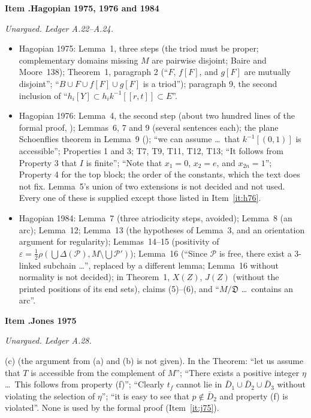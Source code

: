 \documentclass[11pt]{article}
\newcounter{defect}
\newenvironment{defect}[4]{%
  \par\addvspace{10pt}\refstepcounter{defect}%
  \noindent\textbf{Item \thedefect.\enspace #1}\par\nopagebreak
  \noindent\textit{#2}\par\nopagebreak\smallskip}{\par\addvspace{6pt}}
\begin{document}
\begin{defect}{Hagopian 1975, 1976 and 1984}{Unargued. Ledger A.22--A.24.}{0}{0}\label{it:un-hag}
\begin{itemize}
\item Hagopian 1975: Lemma~1, three steps (the triod must be proper; complementary domains missing
  $M$ are pairwise disjoint; Baire and Moore~138); Theorem~1, paragraph 2 (``$F$, $f[F]$, and
  $g[F]$ are mutually disjoint''; ``$B\cup F\cup f[F]\cup g[F]$ is a triod''); paragraph 9, the
  second inclusion of ``$h_i[Y]\subset h_ik^{-1}[[r,t]]\subset E$''.
\item Hagopian 1976: Lemma~4, the second step (about two hundred lines of the formal proof,
  ); Lemmas~6, 7 and 9 (several sentences each); the plane
  Schoenflies theorem in Lemma~9 (); ``we can assume \ldots\ that
  $k^{-1}[(0,1)]$ is accessible''; Properties 1 and 3; T7, T9, T11, T12, T13; ``It follows from
  Property 3 that $I$ is finite''; ``Note that $x_1=0$, $x_2=e$, and $x_{2n}=1$''; Property 4 for
  the top block; the order of the constants, which the text does not fix. Lemma~5's union of two
  extensions is not decided and not used. Every one of these is supplied except those listed in
  Item~\ref{it:h76}.
\item Hagopian 1984: Lemma~7 (three atriodicity steps, avoided); Lemma~8 (an arc); Lemma~12; Lemma~13
  (the hypotheses of Lemma~3, and an orientation argument for regularity); Lemmas~14--15
  (positivity of $\varepsilon=\frac12\rho(\bigcup\Delta(\mathcal P),M\setminus\bigcup\mathcal P')$);
  Lemma~16 (``Since $\mathcal P$ is free, there exist a 3-linked subchain \ldots'', replaced by a
  different lemma; Lemma~16 without normality is not decided); in Theorem~1, $X(Z)$, $J(Z)$ (without
  the printed positions of its end sets), claims (5)--(6), and ``$M/\mathfrak D$ \ldots\ contains an
  arc''.
\end{itemize}
\end{defect}

\begin{defect}{Jones 1975}{Unargued. Ledger A.28.}{0}{0}\label{it:un-j75}
(c) (the argument from (a) and (b) is not given). In the Theorem: ``let us assume that $T$ is
accessible from the complement of $M$''; ``There exists a positive integer $\eta$ \ldots\ This
follows from property (f)''; ``Clearly $t_f$ cannot lie in $\bar D_1\cup\bar D_2\cup\bar D_3$
without violating the selection of $\eta$''; ``it is easy to see that $p\notin\bar D_2$ and property
(f) is violated''. None is used by the formal proof (Item~\ref{it:j75}).
\end{defect}
\end{document}
